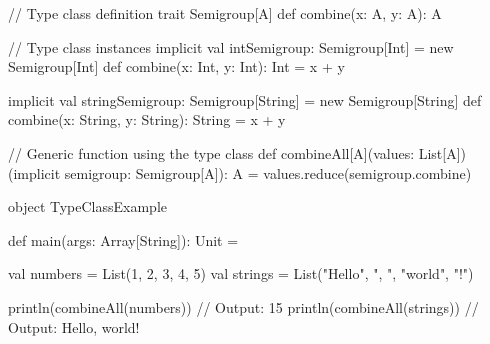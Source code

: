 // Type class definition
trait Semigroup[A] {
  def combine(x: A, y: A): A
}

// Type class instances
implicit val intSemigroup: Semigroup[Int] = new Semigroup[Int] {
  def combine(x: Int, y: Int): Int = x + y
}

implicit val stringSemigroup: Semigroup[String] = new Semigroup[String] {
  def combine(x: String, y: String): String = x + y
}

// Generic function using the type class
def combineAll[A](values: List[A])(implicit semigroup: Semigroup[A]): A =
  values.reduce(semigroup.combine)

object TypeClassExample {
  def main(args: Array[String]): Unit = {
    val numbers = List(1, 2, 3, 4, 5)
    val strings = List("Hello", ", ", "world", "!")

    println(combineAll(numbers)) // Output: 15
    println(combineAll(strings)) // Output: Hello, world!
  }
}
